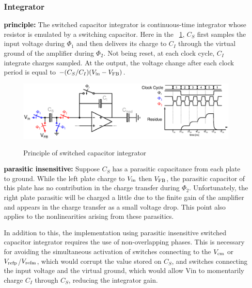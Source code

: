 	\subsubsection{Integrator}              %
\textbf{\textcolor{black}{principle:}}
The switched capacitor integrator is continuous-time integrator whose resistor is emulated by a switching capacitor. Here in the \figurename~\ref{fig:sigma-delta-integration}, $C_S$ first samples the input voltage during $\Phi_1$ and then delivers its charge to $C_I$ through the virtual ground of the amplifier during $\Phi_2$. Not being reset, at each clock cycle, $C_I$ integrate charges sampled. At the output, the voltage change after each clock period is equal to $-(C_S/C_I)(V_{\rm in} - V_{\rm FB})$.

\begin{figure}[htp]
	\centering
	\includegraphics[width=\textwidth]{Chapter4/Figs/sigma-delta-integration.ps}
	\begin{subfigure}[b]{0.48\textwidth}
		\centering
	\end{subfigure}
	\begin{subfigure}[b]{0.48\textwidth}
		\centering
	\end{subfigure}
	\caption{Principle of switched capacitor integrator}
	\label{fig:sigma-delta-integration}
\end{figure}

\textbf{\textcolor{black}{parasitic insensitive:}}
Suppose $C_S$ has a parasitic capacitance from each plate to ground. While the left plate charge to $V_{\rm in}$ then $V_{\rm FB}$, the parasitic capacitor of this plate has no contribution in the charge transfer during $\Phi_2$. Unfortunately, the right plate parasitic will be charged a little due to the finite gain of the amplifier and appears in the charge transfer as a small voltage drop. This point also applies to the nonlinearities arising from these parasitics.

In addition to this, the implementation using parasitic insensitive switched capacitor integrator requires the use of non-overlapping phases. This is necessary for avoiding the simultaneous activation of switches connecting to the $V_{\rm cm}$ or $V_{\rm refp}$/$V_{\rm refm}$, which would corrupt the value stored on $C_S$, and switches connecting the input voltage and the virtual ground, which would allow Vin to momentarily charge $C_I$ through $C_S$, reducing the integrator gain. 

